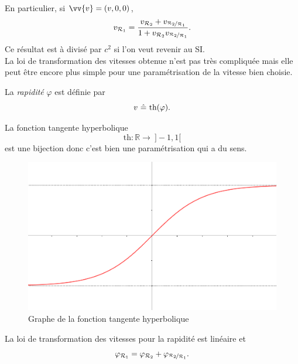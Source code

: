 \documentclass[a4paper,11pt]{report}
\begin{document}
            En particulier, si $\vv{v} = (v,0,0)$, 
            \begin{equation}
                v_{\mathcal{R}_1}  = \frac{v_{\mathcal{R}_2}+v_{\nicefrac{\mathcal{R}_2}{\mathcal{R}_1}}}{1+v_{\mathcal{R}_2}v_{\nicefrac{\mathcal{R}_2}{\mathcal{R}_1}}}.
                \label{LTVx}
            \end{equation}
            Ce résultat est à divisé par $c^2$ si l'on veut revenir au SI.\\
            
            La loi de transformation des vitesses obtenue n'est pas très compliquée mais elle peut être encore plus simple pour une paramétrisation de la vitesse bien choisie.
            
            \begin{defn}
                La \textit{rapidité} $\varphi$ est définie par
                \begin{equation}
                    v~\hat{=}~\text{th}(\varphi).
                \end{equation}
            \end{defn}
            
            La fonction tangente hyperbolique 
            $$\text{th}:\mathbb{R}\to~ ]-1,1[$$ 
            est une bijection donc c'est bien une paramétrisation qui a du sens.
            
            \begin{figure}[H]
            \centering
            \includegraphics[scale = 0.4]{Tanh.PNG}
            \caption{Graphe de la fonction tangente hyperbolique}
            \end{figure}
            
            \begin{prop}\begin{leftbar}
                La loi de transformation des vitesses pour la rapidité est linéaire et 
                \begin{equation}
                    \varphi_{\mathcal{R}_1} = \varphi_{\mathcal{R}_2}+\varphi_{\nicefrac{\mathcal{R}_2}{\mathcal{R}_1}}.
                \end{equation}
            \end{leftbar}\end{prop}
            
\end{document}
